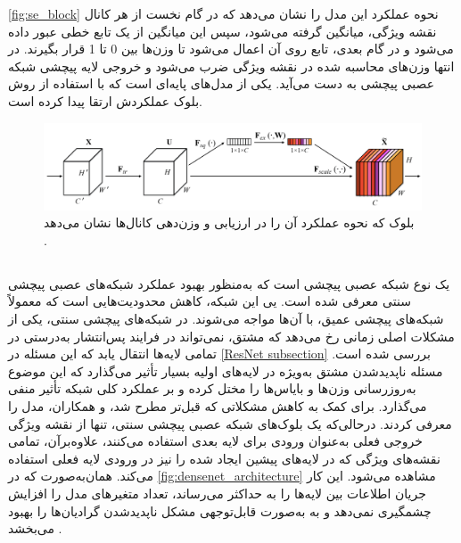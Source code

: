 \autoref{fig:se_block}
نحوه عملکرد این مدل را نشان می‌دهد که در گام نخست از هر کانال نقشه ویژگی، میانگین گرفته می‌شود، سپس این میانگین از یک تابع خطی عبور داده می‌شود و در گام بعدی، تابع 
روی آن اعمال می‌شود تا وزن‌ها بین 0 تا 1 قرار بگیرند.
در انتها وزن‌های محاسبه شده در نقشه ویژگی ضرب می‌شود و خروجی لایه پیچشی 
 شبکه عصبی پیچشی به دست می‌آید.
 یکی از مدل‌های پایه‌ای است که با استفاده از روش بلوک
 عملکردش ارتقا پیدا کرده است.
 
\begin{figure}[h!]
    \centering
    \includegraphics[width=1\textwidth]{Images/Chapter2/squeeze and excitation.png}
    \caption{بلوک  که نحوه عملکرد آن را در ارزیابی و وزن‌دهی کانال‌ها نشان می‌دهد \cite{hu2018squeeze}.}
    \label{fig:se_block}
\end{figure}




\subsection{}

یک نوع شبکه‌ عصبی پیچشی است که به‌منظور بهبود عملکرد شبکه‌های عصبی پیچشی سنتی معرفی شده ‌است. یی این شبکه، کاهش محدودیت‌هایی است که معمولاً شبکه‌های پیچشی عمیق، با آن‌ها مواجه می‌شوند.
در شبکه‌های پیچشی سنتی، یکی از مشکلات اصلی زمانی رخ می‌دهد که مشتق، نمی‌تواند در فرایند پس‌انتشار به‌درستی در تمامی لایه‌ها انتقال یابد که این مسئله در
\autoref{ResNet subsection}
بررسی شده است. مسئله ناپدیدشدن مشتق به‌ویژه در لایه‌های اولیه بسیار تأثیر می‌گذارد که این موضوع به‌روزرسانی وزن‌ها و بایاس‌ها را مختل کرده و بر عملکرد کلی شبکه تأثیر منفی می‌گذارد.
برای کمک به کاهش مشکلاتی که قبل‌تر مطرح شد،
\cite{huang2017densely}
و همکاران، مدل 
 ‌را معرفی کردند. درحالی‌که یک بلوک‌های شبکه عصبی پیچشی‌ سنتی، تنها از نقشه ویژگی خروجی فعلی به‌عنوان ورودی برای لایه بعدی استفاده می‌کنند،
   علاوه‌برآن، تمامی نقشه‌های ویژگی که در لایه‌های پیشین ایجاد شده را نیز در ورودی لایه فعلی استفاده می‌کند. همان‌به‌صورت که در \autoref{fig:densenet_architecture} مشاهده می‌شود. این کار جریان اطلاعات بین لایه‌ها را به حداکثر می‌رساند، تعداد متغیرهای مدل را افزایش چشمگیری نمی‌دهد و به به‌صورت قابل‌توجهی مشکل ناپدیدشدن گرادیان‌ها را بهبود می‌بخشد .

